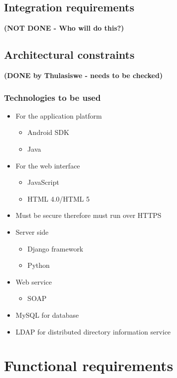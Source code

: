 \documentclass[11pt,a4paper]{article}
\begin{document}
\subsection{Integration requirements}
\textbf{(NOT DONE - Who will do this?)}\\



\subsection{Architectural constraints}
\textbf{(DONE by Thulasiswe - needs to be checked)}\\
\subsubsection{Technologies to be used}
	\begin{itemize}
		\item For the application platform
		\begin{itemize}
			\item Android SDK
			\item Java
		\end{itemize}
		\item For the web interface
		\begin{itemize}
			\item JavaScript
			\item HTML 4.0/HTML 5
		\end{itemize}
		\item Must be secure therefore must run over HTTPS
		\item Server side
		\begin{itemize}
			\item Django framework
			\item Python
		\end{itemize}
		\item Web service
		\begin{itemize}
			\item SOAP
		\end{itemize}
		\item MySQL for database
		\item LDAP for distributed directory information service
	\end{itemize}

\section{Functional requirements}
\end{document}
